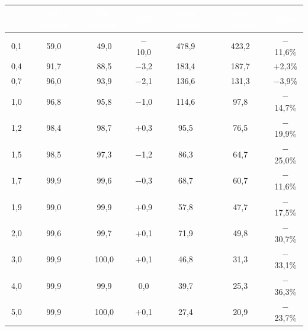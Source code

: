 \begin{table}[H]
\centering
\renewcommand{\arraystretch}{0.95}
\setlength{\tabcolsep}{4pt}
\footnotesize
\begin{tabular}{c c c c c c c}
\toprule
\rowcolor{headerbg}
\textcolor{white}{\textbf{$v_{\max}$}} &
\textcolor{white}{\textbf{SR singola}} &
\textcolor{white}{\textbf{SR doppia}} &
\textcolor{white}{\textbf{$\Delta$SR}} &
\textcolor{white}{\textbf{step singola}} &
\textcolor{white}{\textbf{step doppia}} &
\textcolor{white}{\textbf{$\Delta$step}} \\
\midrule
0{,}1 & 59{,}0 & 49{,}0 & \textcolor{red!70!black}{$-$10{,}0} & 478{,}9 & 423{,}2 & \textcolor{green!50!black}{$-$11{,}6\%} \\
\rowcolor{rowalt}
0{,}4 & 91{,}7 & 88{,}5 & \textcolor{red!70!black}{$-$3{,}2} & 183{,}4 & 187{,}7 & \textcolor{red!70!black}{$+$2{,}3\%} \\
0{,}7 & 96{,}0 & 93{,}9 & \textcolor{red!70!black}{$-$2{,}1} & 136{,}6 & 131{,}3 & \textcolor{green!50!black}{$-$3{,}9\%} \\
\rowcolor{rowalt}
1{,}0 & 96{,}8 & 95{,}8 & \textcolor{red!70!black}{$-$1{,}0} & 114{,}6 & 97{,}8 & \textcolor{green!50!black}{$-$14{,}7\%} \\
1{,}2 & 98{,}4 & 98{,}7 & \textcolor{green!50!black}{$+$0{,}3} & 95{,}5 & 76{,}5 & \textcolor{green!50!black}{$-$19{,}9\%} \\
\rowcolor{rowalt}
1{,}5 & 98{,}5 & 97{,}3 & \textcolor{red!70!black}{$-$1{,}2} & 86{,}3 & 64{,}7 & \textcolor{green!50!black}{$-$25{,}0\%} \\
1{,}7 & 99{,}9 & 99{,}6 & \textcolor{red!70!black}{$-$0{,}3} & 68{,}7 & 60{,}7 & \textcolor{green!50!black}{$-$11{,}6\%} \\
\rowcolor{rowalt}
1{,}9 & 99{,}0 & 99{,}9 & \textcolor{green!50!black}{$+$0{,}9} & 57{,}8 & 47{,}7 & \textcolor{green!50!black}{$-$17{,}5\%} \\
2{,}0 & 99{,}6 & 99{,}7 & \textcolor{green!50!black}{$+$0{,}1} & 71{,}9 & 49{,}8 & \textcolor{green!50!black}{$-$30{,}7\%} \\
\rowcolor{rowalt}
3{,}0 & 99{,}9 & 100{,}0 & \textcolor{green!50!black}{$+$0{,}1} & 46{,}8 & 31{,}3 & \textcolor{green!50!black}{$-$33{,}1\%} \\
4{,}0 & 99{,}9 & 99{,}9 & 0{,}0 & 39{,}7 & 25{,}3 & \textcolor{green!50!black}{$-$36{,}3\%} \\
\rowcolor{rowalt}
5{,}0 & 99{,}9 & 100{,}0 & \textcolor{green!50!black}{$+$0{,}1} & 27{,}4 & 20{,}9 & \textcolor{green!50!black}{$-$23{,}7\%} \\

\end{tabular}
\end{table}
